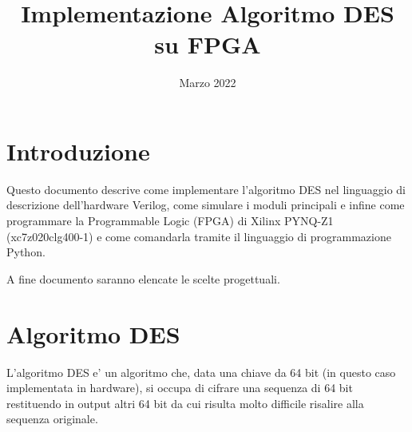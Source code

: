 \documentclass[a4paper]{article}
\title{Implementazione Algoritmo DES su FPGA}
\date{Marzo 2022}
\begin{document}
\begin{titlepage}
\maketitle
\end{titlepage}

\tableofcontents
\clearpage

\section{Introduzione}
Questo documento descrive come implementare l'algoritmo DES nel linguaggio di descrizione dell'hardware Verilog,
come simulare i moduli principali e infine come programmare la Programmable Logic (FPGA) di Xilinx PYNQ-Z1 (xc7z020clg400-1) 
e come comandarla tramite il linguaggio di programmazione Python.

A fine documento saranno elencate le scelte progettuali.


\section{Algoritmo DES}
L'algoritmo DES e' un algoritmo che, data una chiave da 64 bit (in questo caso implementata in hardware), 
si occupa di cifrare una sequenza di 64 bit restituendo in output altri 64 bit da cui risulta molto difficile risalire alla sequenza originale.
\end{document}
